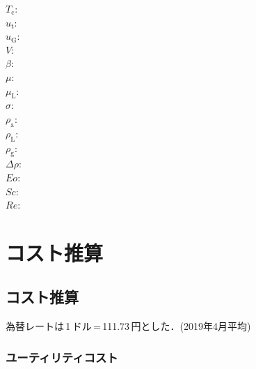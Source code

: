 \documentclass[a4j]{jsreport}
\begin{document}
\begin{multicols}{2}
\begin{flushleft}
    $T_{\mathrm{c}}$:\\
    $u_{\mathrm{t}}$:\\
    $u_{\mathrm{G}}$:\\
    $V$:\\
    $\beta$:\\
    $\mu$:\\
    $\mu_{\mathrm{L}}$:\\
    $\sigma$:\\
    $\rho_{\mathrm{a}}$:\\
    $\rho_{\mathrm{L}}$:\\
    $\rho_{\mathrm{g}}$:\\
    $\Delta\rho$:\\
    $Eo$:\\
    $Sc$:\\
    $Re$:
\end{flushleft}
\end{multicols}

\appendix

\chapter{コスト推算}

\section{コスト推算}

為替レートは\,1\,ドル\,=\,111.73\,円とした．(2019年4月平均)
\subsection{ユーティリティコスト}
\end{document}
